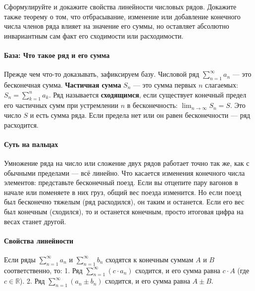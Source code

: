 
{Сформулируйте и докажите свойства линейности числовых рядов. Докажите также теорему о том, что отбрасывание, изменение или добавление конечного числа членов ряда влияет на значение его суммы, но оставляет абсолютно инвариантным сам факт его сходимости или расходимости.}

\paragraph{База: Что такое ряд и его сумма}
Прежде чем что-то доказывать, зафиксируем базу. Числовой ряд $\sum_{n=1}^\infty a_n$ — это бесконечная сумма. 
\textbf{Частичная сумма} $S_n$ — это сумма первых $n$ слагаемых: $S_n = \sum_{k=1}^n a_k$.
Ряд называется \textbf{сходящимся}, если существует конечный предел его частичных сумм при устремлении $n$ в бесконечность: $\lim_{n \to \infty} S_n = S$. Это число $S$ и есть сумма ряда. Если предела нет или он равен бесконечности — ряд расходится.

\paragraph{Суть на пальцах}
Умножение ряда на число или сложение двух рядов работает точно так же, как с обычными пределами — всё линейно. Что касается изменения конечного числа элементов: представьте бесконечный поезд. Если вы отцепите пару вагонов в начале или поменяете в них груз, общий вес поезда изменится. Но если поезд был бесконечно тяжелым (ряд расходился), он таким и останется. Если его вес был конечным (сходился), то и останется конечным, просто итоговая цифра на весах станет другой.

\paragraph{Свойства линейности}
Если ряды $\sum_{n=1}^\infty a_n$ и $\sum_{n=1}^\infty b_n$ сходятся к конечным суммам $A$ и $B$ соответственно, то:
1. Ряд $\sum_{n=1}^\infty (c \cdot a_n)$ сходится, и его сумма равна $c \cdot A$ (где $c \in \mathbb{R}$).
2. Ряд $\sum_{n=1}^\infty (a_n \pm b_n)$ сходится, и его сумма равна $A \pm B$.

